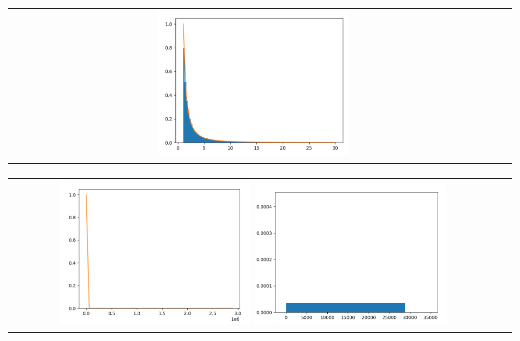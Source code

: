 \documentclass[answers]{exam}
\begin{document}
     \begin{center}
      \begin{tabular}{cc}
      \includegraphics[width= 0.4\textwidth]{"Q2/beforeremoving.png"}
    \end{tabular}
    \begin{tabular}{cc}
      \includegraphics[width= 0.4\textwidth]{"Q2/afterremoving.png"}
      \includegraphics[width= 0.4\textwidth]{"Q2/afterremoving2.png"} 
    \end{tabular} 
    \end{center}
        
\end{document}
